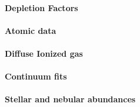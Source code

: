 \paragraph{Depletion Factors} 
\paragraph{Atomic data}
\paragraph{Diffuse Ionized gas}
\paragraph{Continuum fits}
\paragraph{Stellar and nebular abundances}




%
%
%